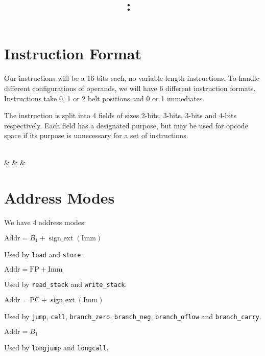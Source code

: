 \documentclass{article}
\title{
	\vspace{2in}
	\textmd{\textbf{\hmwkClass:\ \hmwkTitle}}\\
	\vspace{3in}
}
\author{\hmwkAuthorName}
\date{}
\begin{document}
\maketitle

\pagebreak

\section{Instruction Format}

	Our instructions will be a 16-bits each, no variable-length instructions.
	To handle different configurations of operands, we will have 6 different instruction formats.
	Instructions take 0, 1 or 2 belt positions and 0 or 1 immediates.

	The instruction is split into 4 fields of sizes 2-bits, 3-bits, 3-bits and 4-bits respectively.
	Each field has a designated purpose, but may be used for opcode space if its purpose is unnecessary for a set of instructions.

	\vspace{5mm}

	\begin{bytefield}[endianness=big,bitwidth=3em,bitheight=6ex]{16}
		 \\
		 &
		 &
		 &
		 \\
	\end{bytefield}


\section{Address Modes}

	We have 4 address modes:
	\begin{description}[font=\sffamily\bfseries]
		\item[data] \(\textrm{Addr} = B_1 + \operatorname{sign\_ext}\left(\textrm{Imm}\right)\)

			Used by \texttt{load} and \texttt{store}.

		\item[stack] \(\textrm{Addr} = \textrm{FP} + \textrm{Imm}\)

			Used by \texttt{read\_stack} and \texttt{write\_stack}.

		\item[code] \(\textrm{Addr} = \textrm{PC} + \operatorname{sign\_ext}\left(\textrm{Imm}\right)\)

			Used by \texttt{jump}, \texttt{call}, \texttt{branch\_zero}, \texttt{branch\_neg}, \texttt{branch\_oflow} and \texttt{branch\_carry}.

		\item[long code] \(\textrm{Addr} = B_1\)

			Used by \texttt{longjump} and \texttt{longcall}.

	\end{description}
\end{document}
